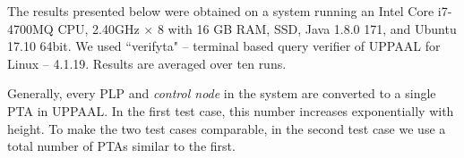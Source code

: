 \documentclass[letterpaper]{article}
\begin{document}
The results presented below were obtained on a system running an Intel Core i7-4700MQ CPU, 2.40GHz $\times$ 8 with 16 GB RAM, SSD, Java 1.8.0 171, and Ubuntu 17.10 64bit. We used 
``verifyta" -- terminal based query verifier of UPPAAL for Linux -- 4.1.19. Results are averaged over ten runs. 

Generally, every PLP and {\em control node} in the system are converted to a single PTA in UPPAAL. In the first test case, this number increases exponentially with height.  To make the two test cases comparable, in the second test case we use a total number of PTAs similar to the first. 






\end{document}
